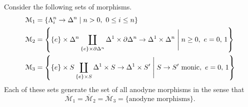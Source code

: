 \documentclass[main.tex]{subfiles}
\begin{document}
\begin{theorem}
  \label{thm:saturated_hull_of_various_sets_are_anodyne_morphisms}
  Consider the following sets of morphisms.
  \begin{align*}
    \mathcal{M}_{1} &= \left\{ \Lambda^{n}_{i} \to \Delta^{n} \mid n > 0,\ 0 \leq i \leq n \right\} \\
    \mathcal{M}_{2} &= \left\{ \{e\} \times \Delta^{n} \coprod_{\{e\} \times \partial \Delta^{n}} \Delta^{1} \times \partial\Delta^{n} \to \Delta^{1} \times \Delta^{n} \Biggm| n \geq 0,\ e = 0,\, 1 \right\} \\
    \mathcal{M}_{3} &= \left\{ \{e\} \times S \coprod_{\{e\} \times S} \Delta^{1} \times S \to \Delta^{1} \times S' \Biggm| S \to S'\ \text{monic},\ e = 0,\, 1 \right\}
  \end{align*}
  Each of these sets generate the set of all anodyne morphisms in the sense that
  \begin{equation*}
    \overline{\mathcal{M}}_{1} = \overline{\mathcal{M}}_{2} = \overline{\mathcal{M}}_{3} = \{\text{anodyne morphisms}\}.
  \end{equation*}
\end{theorem}
\end{document}
